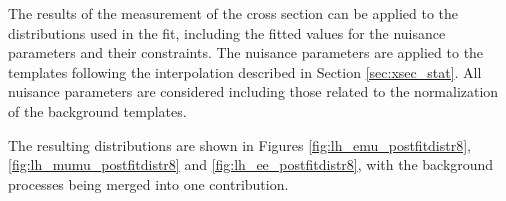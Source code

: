 The results of the measurement of the \ttbar cross section can be applied to the distributions used in the fit, including the fitted values for the
nuisance parameters and their constraints. The nuisance parameters are applied to the templates following the interpolation described in Section \ref{sec:xsec_stat}.
All nuisance parameters are considered including those related to the normalization of the background templates.

The resulting distributions are shown in Figures \ref{fig:lh_emu_postfitdistr8}, \ref{fig:lh_mumu_postfitdistr8} and \ref{fig:lh_ee_postfitdistr8}, with the background processes
being merged into one contribution.




\begin{figure}[htbp!]
  \begin{center}

\end{center}
\end{figure}
